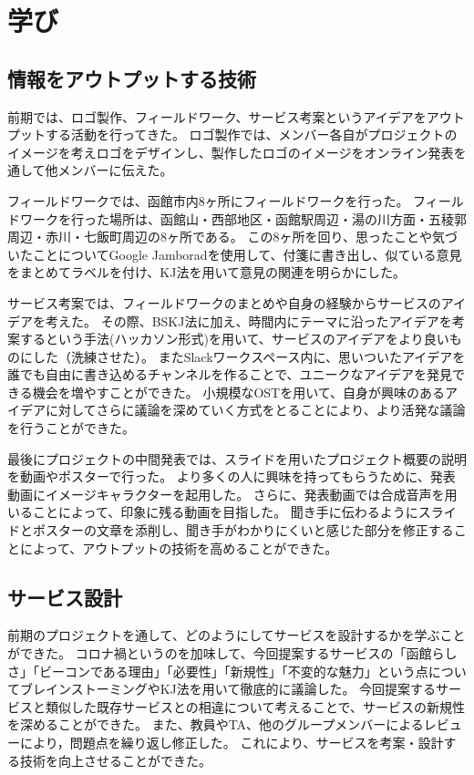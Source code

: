 \chapter{学び}

\section{情報をアウトプットする技術}
前期では、ロゴ製作、フィールドワーク、サービス考案というアイデアをアウトプットする活動を行ってきた。
ロゴ製作では、メンバー各自がプロジェクトのイメージを考えロゴをデザインし、製作したロゴのイメージをオンライン発表を通して他メンバーに伝えた。

フィールドワークでは、函館市内8ヶ所にフィールドワークを行った。
フィールドワークを行った場所は、函館山・西部地区・函館駅周辺・湯の川方面・五稜郭周辺・赤川・七飯町周辺の8ヶ所である。
この8ヶ所を回り、思ったことや気づいたことについてGoogle Jamboradを使用して、付箋に書き出し、似ている意見をまとめてラベルを付け、KJ法を用いて意見の関連を明らかにした。

サービス考案では、フィールドワークのまとめや自身の経験からサービスのアイデアを考えた。
その際、BSKJ法に加え、時間内にテーマに沿ったアイデアを考案するという手法(ハッカソン形式)を用いて、サービスのアイデアをより良いものにした（洗練させた）。
またSlackワークスペース内に、思いついたアイデアを誰でも自由に書き込めるチャンネルを作ることで、ユニークなアイデアを発見できる機会を増やすことができた。
小規模なOSTを用いて、自身が興味のあるアイデアに対してさらに議論を深めていく方式をとることにより、より活発な議論を行うことができた。

最後にプロジェクトの中間発表では、スライドを用いたプロジェクト概要の説明を動画やポスターで行った。
より多くの人に興味を持ってもらうために、発表動画にイメージキャラクターを起用した。
さらに、発表動画では合成音声を用いることによって、印象に残る動画を目指した。
聞き手に伝わるようにスライドとポスターの文章を添削し、聞き手がわかりにくいと感じた部分を修正することによって、アウトプットの技術を高めることができた。

\section{サービス設計}
前期のプロジェクトを通して、どのようにしてサービスを設計するかを学ぶことができた。
コロナ禍というのを加味して、今回提案するサービスの「函館らしさ」「ビーコンである理由」「必要性」「新規性」「不変的な魅力」という点についてブレインストーミングやKJ法を用いて徹底的に議論した。
今回提案するサービスと類似した既存サービスとの相違について考えることで、サービスの新規性を深めることができた。
また、教員やTA、他のグループメンバーによるレビューにより，問題点を繰り返し修正した。
これにより、サービスを考案・設計する技術を向上させることができた。

